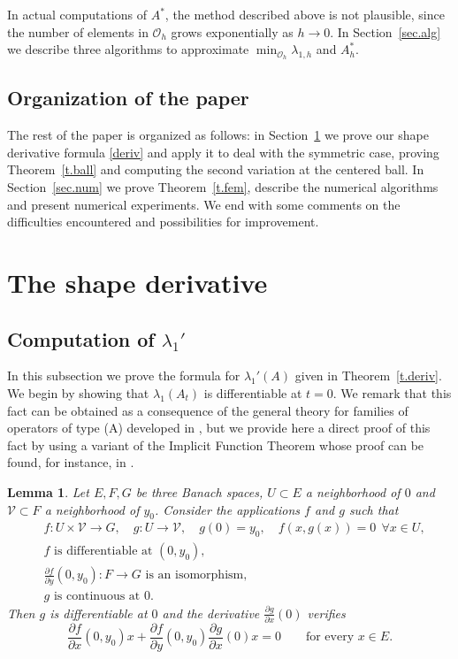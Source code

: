 \documentclass[11pt]{amsart}
\newtheorem{lemma}{Lemma}[section]
\theoremstyle{remark}
\numberwithin{equation}{section}
\begin{document}
In actual computations of $A^*$, the method described above is not plausible, since the number of elements in $\mathcal{O}_h$ grows exponentially as $h\to0$. In Section~\ref{sec.alg} we describe three algorithms to approximate $\min_{\mathcal{O}_h}\lambda_{1,h}$ and $A^*_h$.

\subsection{Organization of the paper}
The rest of the paper is organized as follows: in Section~\ref{sec.shape} we prove our shape derivative formula \eqref{deriv} and apply it to deal with the symmetric case, proving Theorem~\ref{t.ball} and computing the second variation at the centered ball. In Section~\ref{sec.num} we prove Theorem~\ref{t.fem}, describe the numerical algorithms and present numerical experiments. We end with some comments on the difficulties encountered and possibilities for improvement.

\section{The shape derivative}\label{sec.shape}

\subsection{Computation of $\lambda_1'$}
In this subsection we prove the formula for $\lambda_1'(A)$ given in Theorem~\ref{t.deriv}. We begin by showing that $\lambda_1(A_t)$ is differentiable at $t=0$. We remark that this fact can be obtained as a consequence of the general theory for families of operators of type (A) developed in \cite[Chapter~VII]{Ka}, but we provide here a direct proof of this fact by using a variant of the Implicit Function Theorem whose proof can be found, for instance, in \cite{Sc}.

\begin{lemma}\label{l.ift}
Let $E,F,G$ be three Banach spaces, $U\subset E$ a neighborhood of $0$ and $\mathcal{V}\subset F$ a neighborhood of $y_0$. Consider the applications $f$ and $g$ such that
\begin{align}
&f:U\times\mathcal{V}\to G,\quad g:U\to\mathcal{V},\quad g(0)=y_0,\quad f(x,g(x))=0\ \ \forall x\in U,\label{ift1}\\
&f\text{ is differentiable at }(0,y_0),\label{ift2}\\
&\frac{\partial f}{\partial y}(0,y_0):F\to G\text{ is an isomorphism},\label{ift3}\\
&g\text{ is continuous at }0.\label{ift4}
\end{align}
Then $g$ is differentiable at $0$ and the derivative $\frac{\partial g}{\partial x}(0)$ verifies
\[
\frac{\partial f}{\partial x}(0,y_0)x+\frac{\partial f}{\partial y}(0,y_0)\frac{\partial g}{\partial x}(0)x=0\qquad\text{for every } x\in E.
\]
\end{lemma}
\end{document}
